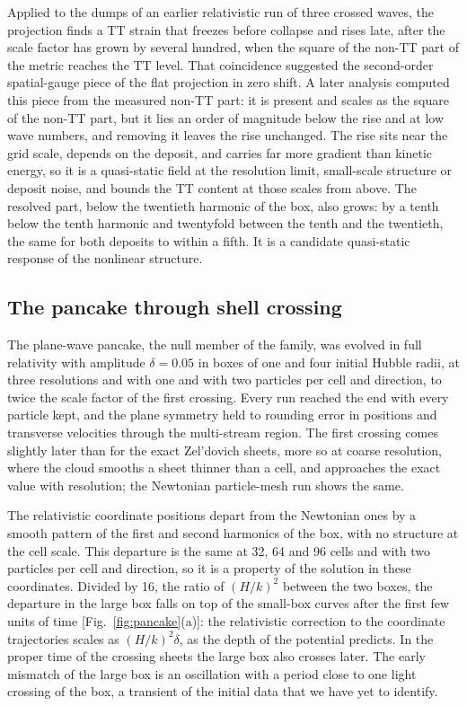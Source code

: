\documentclass[aps,prd,twocolumn,10pt,superscriptaddress,nofootinbib,longbibliography,floatfix]{revtex4-2}
\begin{document}
Applied to the dumps of an earlier relativistic run of three crossed waves, the projection finds a TT strain that freezes before collapse and rises late, after the scale factor has grown by several hundred, when the square of the non-TT part of the metric reaches the TT level. That coincidence suggested the second-order spatial-gauge piece of the flat projection in zero shift. A later analysis computed this piece from the measured non-TT part: it is present and scales as the square of the non-TT part, but it lies an order of magnitude below the rise and at low wave numbers, and removing it leaves the rise unchanged. The rise sits near the grid scale, depends on the deposit, and carries far more gradient than kinetic energy, so it is a quasi-static field at the resolution limit, small-scale structure or deposit noise, and bounds the TT content at those scales from above. The resolved part, below the twentieth harmonic of the box, also grows: by a tenth below the tenth harmonic and twentyfold between the tenth and the twentieth, the same for both deposits to within a fifth. It is a candidate quasi-static response of the nonlinear structure.

\subsection{The pancake through shell crossing}\label{sec:pancake}

The plane-wave pancake, the null member of the family, was evolved in full relativity with amplitude $\delta=0.05$ in boxes of one and four initial Hubble radii, at three resolutions and with one and with two particles per cell and direction, to twice the scale factor of the first crossing. Every run reached the end with every particle kept, and the plane symmetry held to rounding error in positions and transverse velocities through the multi-stream region. The first crossing comes slightly later than for the exact Zel'dovich sheets, more so at coarse resolution, where the cloud smooths a sheet thinner than a cell, and approaches the exact value with resolution; the Newtonian particle-mesh run shows the same.

The relativistic coordinate positions depart from the Newtonian ones by a smooth pattern of the first and second harmonics of the box, with no structure at the cell scale. This departure is the same at 32, 64 and 96 cells and with two particles per cell and direction, so it is a property of the solution in these coordinates. Divided by 16, the ratio of $(H/k)^2$ between the two boxes, the departure in the large box falls on top of the small-box curves after the first few units of time [Fig.~\ref{fig:pancake}(a)]: the relativistic correction to the coordinate trajectories scales as $(H/k)^2\delta$, as the depth of the potential predicts. In the proper time of the crossing sheets the large box also crosses later. The early mismatch of the large box is an oscillation with a period close to one light crossing of the box, a transient of the initial data that we have yet to identify.
\end{document}
